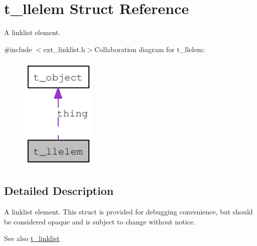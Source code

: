 \hypertarget{structt__llelem}{
\section{t\_\-llelem Struct Reference}
\label{structt__llelem}
}


A linklist element.  


{\ttfamily \#include $<$ext\_\-linklist.h$>$}Collaboration diagram for t\_\-llelem:\nopagebreak
\begin{figure}[H]
\begin{center}
\leavevmode
\includegraphics[width=102pt]{structt__llelem__coll__graph}
\end{center}
\end{figure}


\subsection{Detailed Description}
A linklist element. This struct is provided for debugging convenience, but should be considered opaque and is subject to change without notice.

\begin{DoxySeeAlso}{See also}
\hyperlink{structt__linklist}{t\_\-linklist} 
\end{DoxySeeAlso}
